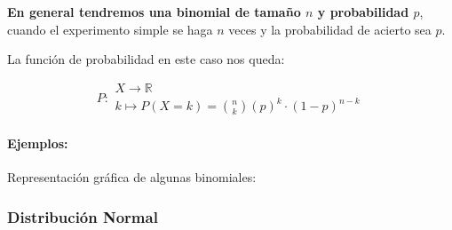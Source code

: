 \textbf{En general tendremos una binomial de tamaño $n$ y probabilidad $p$}, cuando el experimento simple se haga $n$ veces y la probabilidad de acierto sea $p$.

La función de probabilidad en este caso nos queda:
 
 $$P\colon \begin{array}{l} 
          X \rightarrow \mathbb{R} \\ 
          k\mapsto P(X=k)=\binom{n}{k}\left(p\right)^k\cdot  \left(1-p\right)^{n-k} 
         \end{array}$$
         
\paragraph{Ejemplos:} Representación gráfica de algunas binomiales:    
         

         
 

\subsubsection{Distribución Normal}














